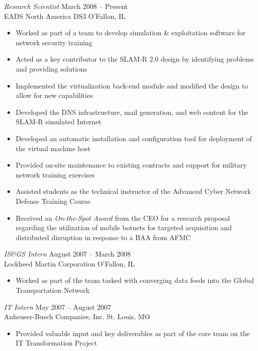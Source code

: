 \documentclass[margin,line]{resume}
\begin{document}
\begin{resume}
{\sl Research Scientist}            \hfill  March 2008 -- Present\\
EADS North America DS3              \hfill  O'Fallon, IL
\begin{itemize} \itemsep -2pt %
\small\item Worked as part of a team to develop simulation \& exploitation software for network security training
\small\item Acted as a key contributor to the SLAM-R 2.0 design by identifying problems and providing solutions
\small\item Implemented the virtualization back-end module and modified the design to allow for new capabilities
\small\item Developed the DNS infrastructure, mail generation, and web content for the SLAM-R simulated Internet
\small\item Developed an automatic installation and configuration tool for deployment of the virtual machine host 
\small\item Provided on-site maintenance to existing contracts and support for military network training exercises
\small\item Assisted students as the technical instructor of the Advanced Cyber Network Defense Training Course
\small\item Received an {\sl On-the-Spot Award} from the CEO for a research proposal regarding the utilization of
            mobile botnets for targeted acquisition and distributed disruption in response to a BAA from AFMC

\end{itemize}

{\sl IS\&GS Intern}                 \hfill  August 2007 -- March 2008\\
Lockheed Martin Corporation         \hfill  O'Fallon, IL
\begin{itemize} \itemsep -2pt %
\small\item Worked as part of the team tasked with converging data feeds into the Global Transportation Network
\end{itemize}

{\sl IT Intern}                     \hfill  May 2007 -- August 2007\\
Anheuser-Busch Companies, Inc.      \hfill  St. Louis, MO
\begin{itemize} \itemsep -2pt %
\small\item Provided valuable input and key deliverables as part of the core team on the IT Transformation Project
\end{itemize}


\end{resume}
\end{document}
